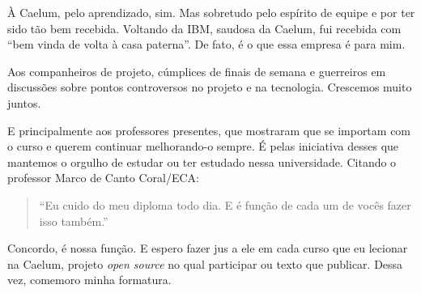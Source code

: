 \documentclass[titlepage,a4paper]{article}
\newcommand{\opensource}{\textit{open source}}
\begin{document}
À Caelum, pelo aprendizado, sim. Mas sobretudo pelo espírito de equipe e por ter sido tão bem recebida. Voltando da IBM, saudosa da Caelum, fui recebida com ``bem vinda de volta à casa paterna''. De fato, é o que essa empresa é para mim.

Aos companheiros de projeto, cúmplices de finais de semana e guerreiros em discussões sobre pontos controversos no projeto e na tecnologia. Crescemos muito juntos.

E principalmente aos professores presentes, que mostraram que se importam com o curso e querem continuar melhorando-o sempre. É pelas iniciativa desses que mantemos o orgulho de estudar ou ter estudado nessa universidade. Citando o professor Marco de Canto Coral/ECA:

\begin{quote}
	``Eu cuido do meu diploma todo dia. E é função de cada um de vocês fazer isso também.''
\end{quote}

Concordo, é nossa função. E espero fazer jus a ele em cada curso que eu lecionar na Caelum, projeto \opensource{} no qual participar ou texto que publicar. Dessa vez, comemoro minha formatura.
\end{document}
